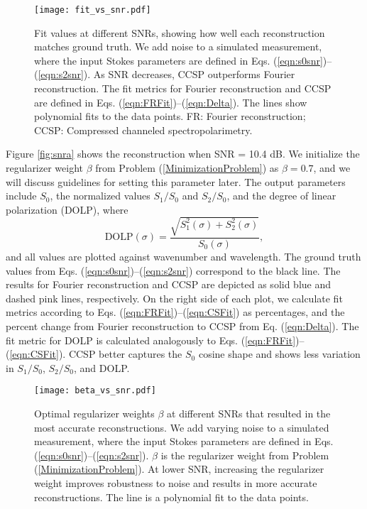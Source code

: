 \documentclass[10pt]{article}
\numberwithin{equation}{subsection}
\begin{document}
\begin{figure}[!htb]
\centering
\texttt{[image: fit\_vs\_snr.pdf]}
\caption{Fit values at different SNRs, showing how well each reconstruction matches ground truth.
        We add noise to a simulated measurement, where the input Stokes parameters are defined in Eqs. (\ref{eqn:s0snr})--(\ref{eqn:s2snr}).
      As SNR decreases, CCSP outperforms Fourier reconstruction.
      The fit metrics for Fourier reconstruction and CCSP are defined in Eqs. (\ref{eqn:FRFit})--(\ref{eqn:Delta}).
      The lines show polynomial fits to the data points.
    FR: Fourier reconstruction; CCSP: Compressed channeled spectropolarimetry.}
    \label{fig:FitVsSNR}
\end{figure}

    Figure \ref{fig:snra} shows the reconstruction when SNR = 10.4 dB.
    We initialize the regularizer weight $\beta$ from Problem (\ref{MinimizationProblem}) as $\beta = 0.7$, and we will discuss guidelines for setting this parameter later.
    The output parameters include $S_0$, the normalized values $S_1 / S_0$ and $S_2 / S_0$, and the degree of linear polarization (DOLP), where
    \begin{equation}
        \text{DOLP}(\sigma) = \frac{\sqrt{S_1^2(\sigma) + S_2^2(\sigma)}}{S_0(\sigma)},
    \end{equation}
    and all values are plotted against wavenumber and wavelength.
    The ground truth values from Eqs. (\ref{eqn:s0snr})--(\ref{eqn:s2snr}) correspond to the black line.
    The results for Fourier reconstruction and CCSP are depicted as solid blue and dashed pink lines, respectively.
    On the right side of each plot, we calculate fit metrics according to Eqs. (\ref{eqn:FRFit})--(\ref{eqn:CSFit}) as percentages, and the percent change from Fourier reconstruction to CCSP from Eq. (\ref{eqn:Delta}).
    The fit metric for DOLP is calculated analogously to Eqs. (\ref{eqn:FRFit})--(\ref{eqn:CSFit}).
    CCSP better captures the $S_0$ cosine shape and shows less variation in $S_1 / S_0$, $S_2 / S_0$, and DOLP.

\begin{figure}[!htb]
\centering
\texttt{[image: beta\_vs\_snr.pdf]}
    \caption{Optimal regularizer weights $\beta$ at different SNRs that resulted in the most accurate reconstructions.
    We add varying noise to a simulated measurement, where the input Stokes parameters are defined in Eqs. (\ref{eqn:s0snr})--(\ref{eqn:s2snr}).
    $\beta$ is the regularizer weight from Problem (\ref{MinimizationProblem}).
    At lower SNR, increasing the regularizer weight improves robustness to noise and results in more accurate reconstructions.
    The line is a polynomial fit to the data points.}
    \label{fig:BetaVsSNR}
\end{figure}
\end{document}
